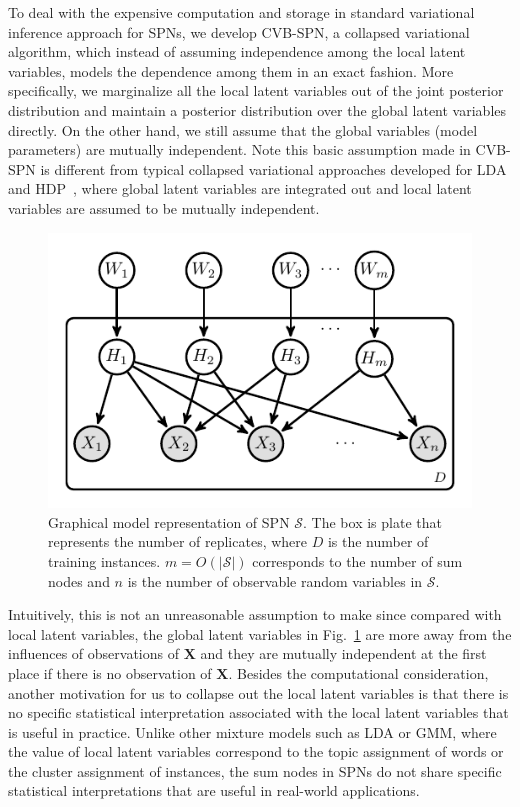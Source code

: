 \documentclass{article} %
\theoremstyle{definition}
\begin{document}
To deal with the expensive computation and storage in standard variational inference approach for SPNs, we develop CVB-SPN, a collapsed variational algorithm, which instead of assuming independence among the local latent variables, models the dependence among them in an exact fashion. More specifically, we marginalize all the local latent variables out of the joint posterior distribution and maintain a posterior distribution over the global latent variables directly. On the other hand, we still assume that the global variables (model parameters) are mutually independent. Note this basic assumption made in CVB-SPN is different from typical collapsed variational approaches developed for LDA and HDP~\cite{teh2006collapsed,teh2007collapsed}, where global latent variables are integrated out and local latent variables are assumed to be mutually independent. 
\begin{figure}[htb]
\centering
	\includegraphics[scale=0.8]{figures/spntemplate.pdf}
\caption{Graphical model representation of SPN $\mathcal{S}$. The box is plate that represents the number of replicates, where $D$ is the number of training instances. $m= O(|\mathcal{S}|)$ corresponds to the number of sum nodes and $n$ is the number of observable random variables in $\mathcal{S}$.}
\label{fig:pgmspn}
\end{figure}
Intuitively, this is not an unreasonable assumption to make since compared with local latent variables, the global latent variables in Fig.~\ref{fig:pgmspn} are more away from the influences of observations of $\mathbf{X}$ and they are mutually independent at the first place if there is no observation of $\mathbf{X}$. Besides the computational consideration, another motivation for us to collapse out the local latent variables is that  there is no specific statistical interpretation associated with the local latent variables that is useful in practice. Unlike other mixture models such as LDA or GMM, where the value of local latent variables correspond to the topic assignment of words or the cluster assignment of instances, the sum nodes in SPNs do not share specific statistical interpretations that are useful in real-world applications. 
\end{document}
